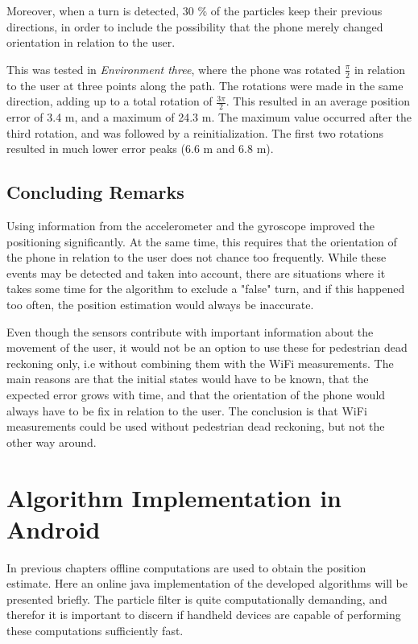 \documentclass{LTHthesis}
\begin{document}
Moreover, when a turn is detected, 30 \% of the particles keep their previous directions, in order to include the possibility that the phone merely changed orientation in relation to the user.

This was tested in \emph{Environment three}, where the phone was rotated $\frac{\pi}{2}$ in relation to the user at three points along the path. The rotations were made in the same direction, adding up to a total rotation of $\frac{3\pi}{2}$. This resulted in an average position error of 3.4 m, and a maximum of 24.3 m. The maximum value occurred after the third rotation, and was followed by a reinitialization. The first two rotations resulted in much lower error peaks (6.6 m and 6.8 m).




\section{Concluding Remarks}
%
Using information from the accelerometer and the gyroscope improved the positioning significantly. At the same time, this requires that the orientation of the phone in relation to the user does not chance too frequently. While these events may be detected and taken into account, there are situations where it takes some time for the algorithm to exclude a "false" turn, and if this happened too often, the position estimation would always be inaccurate.

Even though the sensors contribute with important information about the movement of the user, it would not be an option to use these for pedestrian dead reckoning only, i.e without combining them with the WiFi measurements. The main reasons are that the initial states would have to be known, that the expected error grows with time, and that the orientation of the phone would always have to be fix in relation to the user. The conclusion is that WiFi measurements could be used without pedestrian dead reckoning, but not the other way around.






\chapter{Algorithm Implementation in Android}
%
In previous chapters offline computations are used to obtain the position estimate. Here an online java implementation of the developed algorithms will be presented briefly. The particle filter is quite computationally demanding, and therefor it is important to discern if handheld devices are capable of performing these computations sufficiently fast. 
\end{document}
